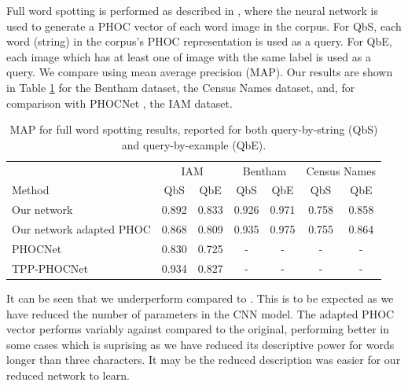 \documentclass[ms,electronic,twosidetoc,letterpaper,chaptercenter,parttop,lof,lot]{byumsphd}
\begin{document}
Full word spotting is performed as described in \cite{sudholt2016}, where the neural network is used to generate a PHOC vector of each word image in the corpus. For QbS, each word (string) in the corpus's PHOC representation is used as a query. For QbE, each image which has at least one of image with the same label is used as a query. We compare using mean average precision (MAP). Our results are shown in Table \ref{tab:wordspottingresults} for the Bentham dataset, the Census Names dataset, and, for comparison with PHOCNet \cite{sudholt2016,sudholt2017}, the IAM dataset.

\begin{table}
\centering
\begin{tabular}{| l | c  c | c c | c c |}
  \hline
   & \multicolumn{2}{c|}{IAM} & \multicolumn{2}{c|}{Bentham} & \multicolumn{2}{c|}{Census Names}\\
  Method & QbS & QbE & QbS & QbE & QbS & QbE\\
  \hline		
  Our network  &  0.892 & 0.833  &  0.926 & 0.971  &  0.758 & 0.858  \\%
  Our network adapted PHOC  &  0.868 & 0.809  &  0.935 & 0.975  &  0.755 & 0.864 \\
  
  PHOCNet\cite{sudholt2016} & 0.830 & 0.725 & - & - & - & - \\
  TPP-PHOCNet\cite{sudholt2017} & 0.934 & 0.827 & - & - & - & - \\
  \hline  
\end{tabular}
\caption{MAP for full word spotting results, reported for both query-by-string (QbS) and query-by-example (QbE).}
\label{tab:wordspottingresults}
\end{table}

It can be seen that we underperform compared to \cite{sudholt2017}. This is to be expected as we have reduced the number of parameters in the  	CNN model. The adapted PHOC vector performs variably against compared to the original,  performing better in some cases which is suprising as we have reduced its descriptive power for words longer than three characters. It may be the reduced description was easier for our reduced network to learn.
\end{document}
